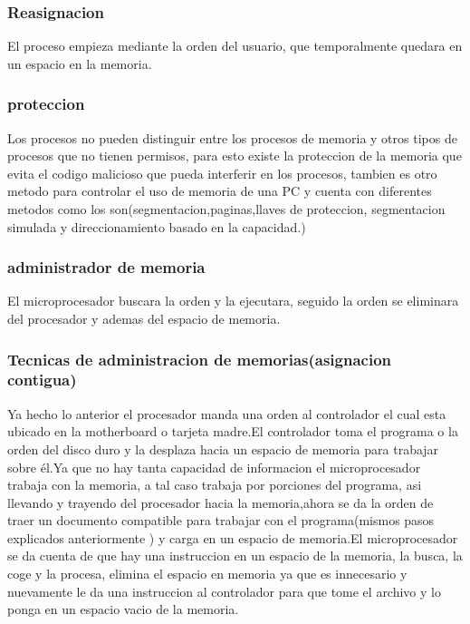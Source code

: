 \documentclass{article}
\begin{document}
        \subsubsection{Reasignacion} El proceso empieza mediante la orden del usuario, que temporalmente quedara en un espacio en la memoria.\cite{wikipedia}
        
        \subsubsection{proteccion} Los procesos no pueden distinguir entre los procesos de memoria y otros tipos de procesos que no tienen permisos, para esto existe la proteccion de la memoria que evita el codigo malicioso que pueda interferir en los procesos, tambien es otro metodo para controlar el uso de memoria de una PC  y cuenta con diferentes metodos como los son(segmentacion,paginas,llaves de proteccion, segmentacion simulada y direccionamiento basado en la capacidad.)\cite{wiki}
        
    
        \subsubsection{administrador de memoria}El microprocesador buscara la orden y la ejecutara, seguido la orden se eliminara del procesador y ademas del espacio de memoria.
    
        \subsubsection{Tecnicas de administracion de memorias(asignacion contigua)}   Ya hecho lo anterior el procesador manda una orden al controlador el cual esta ubicado en la motherboard o tarjeta madre.El controlador toma el programa o la orden del disco duro y la desplaza hacia un espacio de memoria para trabajar sobre él.Ya que no hay tanta capacidad de informacion el microprocesador trabaja con la memoria, a tal caso trabaja por porciones del programa, asi llevando y trayendo del procesador hacia la memoria,ahora se da la orden de traer un documento compatible para trabajar con el programa(mismos pasos explicados anteriormente )  y carga en un espacio de memoria.El microprocesador se da cuenta de que hay una instruccion en un espacio de la memoria, la busca, la coge y la procesa, elimina el espacio en memoria ya que es innecesario y nuevamente le da una instruccion al controlador para que tome el archivo y lo ponga en un espacio vacio de la memoria.\cite{profe}
        
\end{document}

